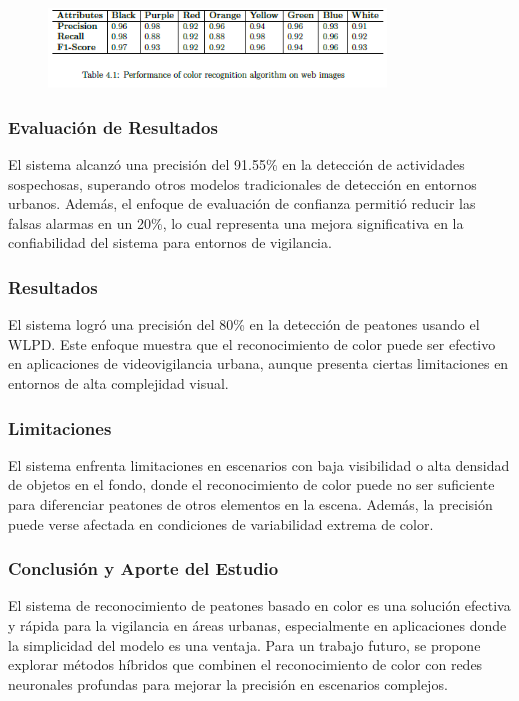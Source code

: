 \begin{figure}[h] %
    \centering
    \includegraphics[width=0.8\textwidth]{4/eva6.png} %
    \label{fig:ejemplo} %
\end{figure}


\subsubsection{Evaluación de Resultados}
El sistema alcanzó una precisión del 91.55\% en la detección de actividades sospechosas, superando otros modelos tradicionales de detección en entornos urbanos. Además, el enfoque de evaluación de confianza permitió reducir las falsas alarmas en un 20\%, lo cual representa una mejora significativa en la confiabilidad del sistema para entornos de vigilancia.

\subsubsection{Resultados}
El sistema logró una precisión del 80\% en la detección de peatones usando el WLPD. Este enfoque muestra que el reconocimiento de color puede ser efectivo en aplicaciones de videovigilancia urbana, aunque presenta ciertas limitaciones en entornos de alta complejidad visual.

\subsubsection{Limitaciones}
El sistema enfrenta limitaciones en escenarios con baja visibilidad o alta densidad de objetos en el fondo, donde el reconocimiento de color puede no ser suficiente para diferenciar peatones de otros elementos en la escena. Además, la precisión puede verse afectada en condiciones de variabilidad extrema de color.

\subsubsection{Conclusión y Aporte del Estudio}
El sistema de reconocimiento de peatones basado en color es una solución efectiva y rápida para la vigilancia en áreas urbanas, especialmente en aplicaciones donde la simplicidad del modelo es una ventaja. Para un trabajo futuro, se propone explorar métodos híbridos que combinen el reconocimiento de color con redes neuronales profundas para mejorar la precisión en escenarios complejos.


